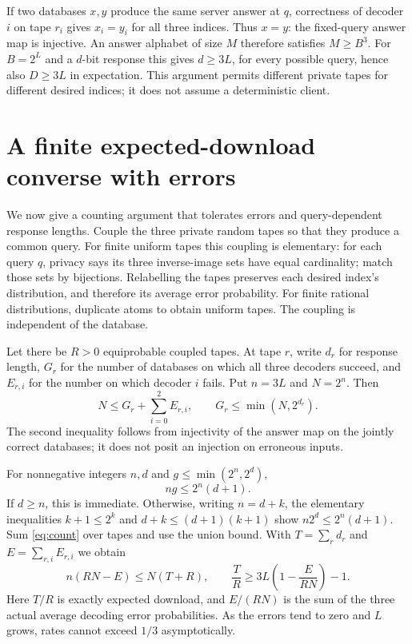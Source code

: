 \documentclass[11pt]{article}
\begin{document}
If two databases $x,y$ produce the same server answer at $q$, correctness of decoder $i$ on tape $r_i$ gives $x_i=y_i$ for all three indices. Thus $x=y$: the fixed-query answer map is injective. An answer alphabet of size $M$ therefore satisfies $M\ge B^3$. For $B=2^L$ and a $d$-bit response this gives $d\ge3L$, for every possible query, hence also $D\ge3L$ in expectation. This argument permits different private tapes for different desired indices; it does not assume a deterministic client.

\section{A finite expected-download converse with errors}
We now give a counting argument that tolerates errors and query-dependent response lengths. Couple the three private random tapes so that they produce a common query. For finite uniform tapes this coupling is elementary: for each query $q$, privacy says its three inverse-image sets have equal cardinality; match those sets by bijections. Relabelling the tapes preserves each desired index's distribution, and therefore its average error probability. For finite rational distributions, duplicate atoms to obtain uniform tapes. The coupling is independent of the database.

Let there be $R>0$ equiprobable coupled tapes. At tape $r$, write $d_r$ for response length, $G_r$ for the number of databases on which all three decoders succeed, and $E_{r,i}$ for the number on which decoder $i$ fails. Put $n=3L$ and $N=2^n$. Then
\[
 N\le G_r+\sum_{i=0}^2E_{r,i},\qquad G_r\le\min(N,2^{d_r}).
\]
The second inequality follows from injectivity of the answer map on the jointly correct databases; it does not posit an injection on erroneous inputs.

For nonnegative integers $n,d$ and $g\le\min(2^n,2^d)$,
\begin{equation}\label{eq:count}
 ng\le2^n(d+1).
\end{equation}
If $d\ge n$, this is immediate. Otherwise, writing $n=d+k$, the elementary inequalities $k+1\le2^k$ and $d+k\le(d+1)(k+1)$ show $n2^d\le2^n(d+1)$. Sum \eqref{eq:count} over tapes and use the union bound. With $T=\sum_r d_r$ and $E=\sum_{r,i}E_{r,i}$ we obtain
\[
 n(RN-E)\le N(T+R),\qquad
 \frac{T}{R}\ge3L\left(1-\frac{E}{RN}\right)-1.
\]
Here $T/R$ is exactly expected download, and $E/(RN)$ is the sum of the three actual average decoding error probabilities. As the errors tend to zero and $L$ grows, rates cannot exceed $1/3$ asymptotically.
\end{document}
